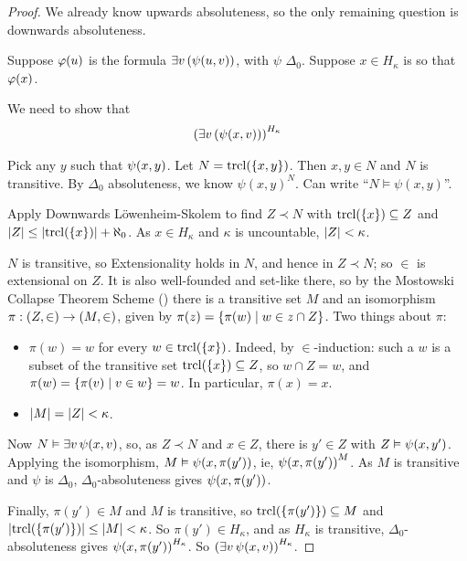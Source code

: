 \begin{proof}
    We already know upwards absoluteness, so the only remaining question is downwards absoluteness.

    Suppose $\varphi(u)$ is the formula $\exists v\left( \psi\!\left( u, v \right) \right)$, with $\psi$ $\Delta_0$. Suppose $x \in H_{\kappa}$ is so that $\varphi\!\left( x \right)$.

    We need to show that
    \begin{align*}
        \left( \exists v\left( \psi\!\left( x, v \right) \right) \right)^{H_{\kappa}}
    \end{align*}

    Pick any $y$ such that $\psi\!\left( x, y \right)$. Let $N = \operatorname{trcl}\!\left( \left\{ x, y \right\} \right)$. Then $x, y \in N$ and $N$ is transitive. By $\Delta_0$ absoluteness, we know $\psi(x, y)^N$. Can write ``$N \models \psi(x, y)$''.

    Apply Downwards Löwenheim-Skolem to find $Z \prec N$ with $\operatorname{trcl}\!\left( \left\{ x \right\} \right) \subseteq Z$ and $\left\lvert Z \right\rvert \leq \left\lvert \operatorname{trcl}\!\left( \left\{ x \right\} \right) \right\rvert + \aleph_0$. As $x \in H_{\kappa}$ and $\kappa$ is uncountable, $\left\lvert Z \right\rvert < \kappa$.

    $N$ is transitive, so Extensionality holds in $N$, and hence in $Z \prec N$; so $\in$ is extensional on $Z$. It is also well-founded and set-like there, so by the Mostowski Collapse Theorem Scheme () there is a transitive set $M$ and an isomorphism $\pi : \left( Z, \in \right) \to \left( M, \in \right)$, given by $\pi(z) = \left\{ \pi(w) \; \middle\vert \; w \in z \cap Z \right\}$. Two things about $\pi$:
    \begin{itemize}
        \item $\pi(w) = w$ for every $w \in \operatorname{trcl}\!\left( \left\{ x \right\} \right)$. Indeed, by $\in$-induction: such a $w$ is a subset of the transitive set $\operatorname{trcl}\!\left( \left\{ x \right\} \right) \subseteq Z$, so $w \cap Z = w$, and $\pi(w) = \left\{ \pi(v) \; \middle\vert \; v \in w \right\} = w$. In particular, $\pi(x) = x$.
        \item $\left\lvert M \right\rvert = \left\lvert Z \right\rvert < \kappa$.
    \end{itemize}

    Now $N \vDash \exists v \, \psi\!\left( x, v \right)$, so, as $Z \prec N$ and $x \in Z$, there is $y' \in Z$ with $Z \vDash \psi\!\left( x, y' \right)$. Applying the isomorphism, $M \vDash \psi\!\left( x, \pi(y') \right)$, ie, $\psi\!\left( x, \pi(y') \right)^M$. As $M$ is transitive and $\psi$ is $\Delta_0$, $\Delta_0$-absoluteness gives $\psi\!\left( x, \pi(y') \right)$.

    Finally, $\pi(y') \in M$ and $M$ is transitive, so $\operatorname{trcl}\!\left( \left\{ \pi(y') \right\} \right) \subseteq M$ and $\left\lvert \operatorname{trcl}\!\left( \left\{ \pi(y') \right\} \right) \right\rvert \leq \left\lvert M \right\rvert < \kappa$. So $\pi(y') \in H_{\kappa}$, and as $H_{\kappa}$ is transitive, $\Delta_0$-absoluteness gives $\psi\!\left( x, \pi(y') \right)^{H_{\kappa}}$. So $\left( \exists v \, \psi\!\left( x, v \right) \right)^{H_{\kappa}}$.
\end{proof}

